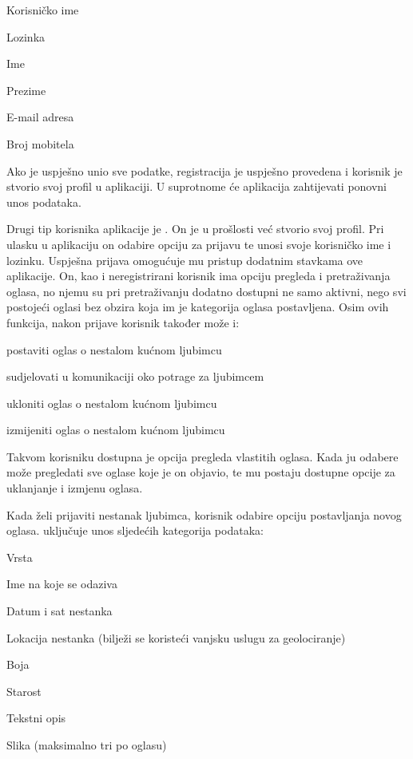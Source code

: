 		\begin{packed_item}
			
			\item  Korisničko ime
			\item  Lozinka
			\item  Ime
			\item  Prezime
			\item  E-mail adresa
			\item  Broj mobitela
			
		\end{packed_item}

		Ako je uspješno unio sve podatke, registracija je uspješno provedena i korisnik je stvorio svoj profil u aplikaciji. U suprotnome će aplikacija zahtijevati ponovni unos podataka.

Drugi tip korisnika aplikacije je . On je u prošlosti već stvorio svoj profil. Pri ulasku u aplikaciju on odabire opciju za prijavu te unosi svoje korisničko ime i lozinku. Uspješna prijava omogućuje mu pristup dodatnim stavkama ove aplikacije. On, kao i neregistrirani korisnik ima opciju pregleda i pretraživanja oglasa, no njemu su pri pretraživanju dodatno dostupni ne samo aktivni, nego svi postojeći oglasi bez obzira koja im je kategorija oglasa postavljena. Osim ovih funkcija, nakon prijave korisnik također može i:

		\begin{packed_enum}
			
			\item  postaviti oglas o nestalom kućnom ljubimcu 
			\item  sudjelovati u komunikaciji oko potrage za ljubimcem 
			\item  ukloniti oglas o nestalom kućnom ljubimcu 
			\item  izmijeniti oglas o nestalom kućnom ljubimcu 
			
		\end{packed_enum}

		Takvom korisniku dostupna je opcija pregleda vlastitih oglasa. Kada ju odabere može pregledati sve oglase koje je on objavio, te mu postaju dostupne opcije za uklanjanje i izmjenu oglasa.

		Kada želi prijaviti nestanak ljubimca, korisnik odabire opciju postavljanja novog oglasa.  uključuje unos sljedećih kategorija podataka:

		\begin{packed_item}
			
			\item  Vrsta
			\item  Ime na koje se odaziva
			\item  Datum i sat nestanka
			\item  Lokacija nestanka (bilježi se koristeći vanjsku uslugu za geolociranje)
			\item  Boja
			\item  Starost
			\item  Tekstni opis
			\item  Slika (maksimalno tri po oglasu)
			
		\end{packed_item}

